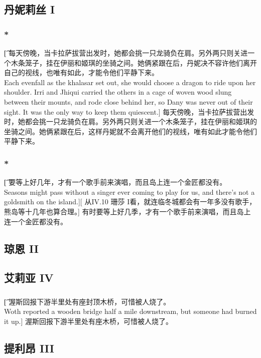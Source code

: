 \documentclass[12pt,a4paper]{article}
\begin{document}
\subsection{丹妮莉丝 I}	
\subsubsection{\color{red}*}\t[
	每天傍晚，当卡拉萨拔营出发时，她都会挑一只龙骑负在肩。另外两只则关进一个木条笼子，挂在伊丽和姬琪的坐骑之间。她俩紧跟在后，丹妮决不容许他们离开自己的视线，也唯有如此，才能令他们平静下来。\\
	Each evenfall as the khalasar set out, she would choose a dragon to ride upon her shoulder. Irri and Jhiqui carried the others in a cage of woven wood slung between their mounts, and rode close behind her, so Dany was never out of their sight. It was the only way to keep them quiescent.]
	每天傍晚，当卡拉萨拔营出发时，她都会挑一只龙骑负在肩。另外两只则关进一个木条笼子，挂在伊丽和姬琪的坐骑之间。她俩紧跟在后，这样丹妮就不会离开他们的视线，唯有如此才能令他们平静下来。
	
\subsubsection{\color{red}*}\t[
	要等上好几年，才有一个歌手前来演唱，而且岛上连一个金匠都没有。\\
	Seasons might pass without a singer ever coming to play for us, and there's not a goldsmith on the island.][
	从IV.10 珊莎 I看，就连临冬城都会有一年多没有歌手，熊岛等十几年也算合理。]
	有时要等上好几季，才有一个歌手前来演唱，而且岛上连一个金匠都没有。
	
\subsection{琼恩 II}

\subsection{艾莉亚 IV}
\subsubsection{}\t[
	渥斯回报下游半里处有座封顶木桥，可惜被人烧了。\\
	Woth reported a wooden bridge half a mile downstream, but someone had burned it up.]
	渥斯回报下游半里处有座木桥，可惜被人烧了。
	
\subsection{提利昂 III}
\end{document}
